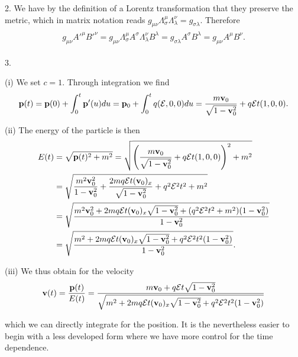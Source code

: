 \documentclass{article}
\begin{document}
2. We have by the definition of a Lorentz transformation that they preserve the metric, which in matrix notation reads $g_{\mu\nu}\Lambda^\mu_\sigma\Lambda^\nu_\lambda=g_{\sigma\lambda}$. Therefore 
\begin{align}
\begin{split}
g_{\mu\nu}A'^\mu B'^\nu=g_{\mu\nu}\Lambda^\mu_\sigma A^\sigma \Lambda^\nu_\lambda B^\lambda=g_{\sigma\lambda}A^\sigma B^\lambda=g_{\mu\nu}A^\mu B^\nu.
\end{split}
\end{align}

3. 

(i) We set $c=1$. Through integration we find
\begin{equation}
\vb{p}(t)=\vb{p}(0)+\int_0^t \vb{p}'(u)du=\vb{p}_0+\int_0^t q(\mathcal{E},0,0)du=\frac{m\vb{v}_0}{\sqrt{1-\vb{v}_0^2}}+q\mathcal{E}t(1,0,0).
\end{equation}

(ii) The energy of the particle is then
\begin{align}
\begin{split}
E(t)&=\sqrt{\vb{p}(t)^2+m^2}=\sqrt{\qty(\frac{m\vb{v}_0}{\sqrt{1-\vb{v}_0^2}}+q\mathcal{E}t(1,0,0))^2+m^2}\\
&=\sqrt{\frac{m^2\vb{v}_0^2}{1-\vb{v}_0^2}+\frac{2mq\mathcal{E}t(\vb{v}_0)_x}{\sqrt{1-\vb{v}_0^2}}+q^2\mathcal{E}^2t^2+m^2}\\
&=\sqrt{\frac{m^2\vb{v}_0^2+2mq\mathcal{E}t(\vb{v}_0)_x\sqrt{1-\vb{v}_0^2}+(q^2\mathcal{E}^2t^2+m^2)(1-\vb{v}_0^2)}{1-\vb{v}_0^2}}\\
&=\sqrt{\frac{m^2+2mq\mathcal{E}t(\vb{v}_0)_x\sqrt{1-\vb{v}_0^2}+q^2\mathcal{E}^2t^2(1-\vb{v}_0^2)}{1-\vb{v}_0^2}}.
\end{split}
\end{align}

(iii) We thus obtain for the velocity
\begin{align}
\begin{split}
\vb{v}(t)&=\frac{\vb{p}(t)}{E(t)}=\frac{m\vb{v}_0+q\mathcal{E}t\sqrt{1-\vb{v}_0^2}}{\sqrt{m^2+2mq\mathcal{E}t(\vb{v}_0)_x\sqrt{1-\vb{v}_0^2}+q^2\mathcal{E}^2t^2(1-\vb{v}_0^2)}}\\
\end{split}
\end{align}

which we can directly integrate for the position. It is the nevertheless easier to begin with a less developed form where we have more control for the time dependence.
\end{document}
